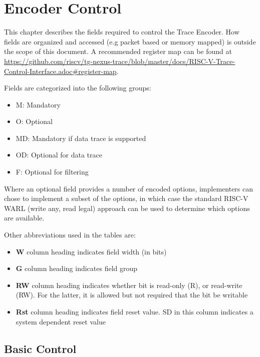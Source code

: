 \chapter{Encoder Control} \label{encoderControl}

This chapter describes the fields required to control the Trace Encoder.  
How fields are organized and accessed (e.g packet based or memory mapped) is outside the scope of this document.  
A recommended register map can be found at \href{https://github.com/riscv/tg-nexus-trace/blob/master/docs/RISC-V-Trace-Control-Interface.adoc#register-map}
{https://github.com/riscv/tg-nexus-trace/blob/master/docs/RISC-V-Trace-Control-Interface.adoc\#register-map}.

Fields are categorized into the following groups:

\begin{itemize}
  \item M: Mandatory
  \item O: Optional
  \item MD: Mandatory if data trace is supported
  \item OD: Optional for data trace
  \item F: Optional for filtering
\end{itemize}

Where an optional field provides a number of encoded options, implementers can chose to implement a subset of the options, 
in which case the standard RISC-V WARL (write any, read legal) approach can be used to determine which options are available.

Other abbreviations used in the tables are:
\begin{itemize}
  \item \textbf{W} column heading indicates field width (in bits)
  \item \textbf{G} column heading indicates field group
  \item \textbf{RW} column heading indicates whether bit is read-only (R), or read-write (RW).  
    For the latter, it is allowed but not required that the bit be writable
  \item \textbf{Rst} column heading indicates field reset value. SD in this column indicates a system dependent reset value
\end{itemize}

\section{Basic Control} \label{sec:ctl-basic}

